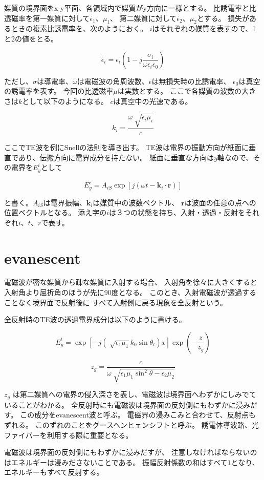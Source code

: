 \documentclass[a4paper,11pt]{jsarticle}
\begin{document}
媒質の境界面をx-y平面、各領域内で媒質がy方向に一様とする。
比誘電率と比透磁率を第一媒質に対して$\dot{\epsilon_1}$、$\mu_1$、
第二媒質に対して$\dot{\epsilon_2}$、$\mu_2$とする。
損失があるときの複素比誘電率を、次のようにおく。
$i$はそれぞれの媒質を表すので、1と2の値をとる。

\begin{equation}
  \dot{\epsilon_i} = \epsilon_i(1 - j\frac{\sigma_i}{\omega\epsilon_i\epsilon_0})
\end{equation}

ただし、$\sigma$は導電率、$\omega$は電磁波の角周波数、$\epsilon$は無損失時の比誘電率、
$\epsilon_0$は真空の誘電率を表す。
今回の比透磁率$\mu$は実数とする。
ここで各媒質の波数の大きさは$k$として以下のようになる。
$c$は真空中の光速である。

\begin{equation}
  k_i = \frac{\omega\sqrt[]{\dot{\epsilon_i}\mu_i}}{c}
\end{equation}

ここでTE波を例にSnellの法則を導き出す。
TE波は電界の振動方向が紙面に垂直であり、伝搬方向に電界成分を持たない。
紙面に垂直な方向は$y$軸なので、その電界を$E^i_y$として

\begin{equation}
  E^i_y = A_{iS}\exp[j(\omega t - \boldsymbol{k}_i\cdot\boldsymbol{r})]
\end{equation}

と書く。$A_{iS}$は電界振幅、$\boldsymbol{k}_i$は媒質中の波数ベクトル、
$\boldsymbol{r}$は波面の任意の点への位置ベクトルとなる。
添え字の$i$は３つの状態を持ち、入射・透過・反射をそれぞれ$i$、$t$、$r$で表す。

\section{evanescent}

電磁波が密な媒質から疎な媒質に入射する場合、
入射角を徐々に大きくすると入射角より屈折角のほうが先に90度となる。
このとき、入射電磁波が透過することなく境界面で反射後に
すべて入射側に戻る現象を全反射という。

全反射時のTE波の透過電界成分は以下のように書ける。

\begin{equation}
  E^t_y = \exp[-j(\sqrt[]{\epsilon_1\mu_1}k_0\sin\theta_t)x]\exp(-\frac{z}{z_g})
\end{equation}

\begin{equation}
  z_g = \frac{c}{\omega\sqrt[]{\epsilon_1\mu_1\sin^{2}\theta - \epsilon_2\mu_2}}
\end{equation}

$z_g$ は第二媒質への電界の侵入深さを表し、電磁波は境界面へわずかにしみでていることがわかる。
全反射時にも電磁波は境界面の反対側にもわずかに浸みだす。
この成分をevanescent波と呼ぶ。
電磁界の浸みこみと合わせて、反射点もずれる。
このずれのことをグースヘンヒェンシフトと呼ぶ。
誘電体導波路、光ファイバーを利用する際に重要となる。

電磁波は境界面の反対側にもわずかに浸みだすが、
注意しなければならないのはエネルギーは浸みださないことである。
振幅反射係数の和はすべて$1$となり、エネルギーもすべて反射する。
\end{document}
